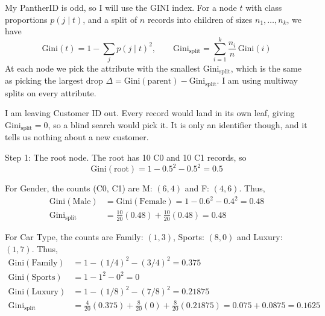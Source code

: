 \documentclass[12pt,letterpaper, onecolumn]{exam}
\begin{document}
\begin{questions}
    \begin{solution}

        My PantherID is odd, so I will use the GINI index. For a node $t$ with class proportions $p(j\mid t)$, and a split of $n$ records into children of sizes $n_1,\dots,n_k$, we have
        \begin{equation*}
            \text{Gini}(t) = 1-\sum_{j} p(j\mid t)^2, \qquad \text{Gini}_{\text{split}} = \sum_{i=1}^{k}\frac{n_i}{n}\,\text{Gini}(i)
        \end{equation*}
        At each node we pick the attribute with the smallest $\text{Gini}_{\text{split}}$, which is the same as picking the largest drop $\Delta = \text{Gini}(\text{parent})-\text{Gini}_{\text{split}}$. I am using multiway splits on every attribute.

        I am leaving Customer ID out. Every record would land in its own leaf, giving $\text{Gini}_{\text{split}}=0$, so a blind search would pick it. It is only an identifier though, and it tells us nothing about a new customer.

        Step 1: The root node. The root has 10 C0 and 10 C1 records, so
        \begin{equation*}
            \text{Gini}(\text{root}) = 1-0.5^2-0.5^2 = 0.5
        \end{equation*}

        For Gender, the counts (C0, C1) are M: $(6,4)$ and F: $(4,6)$. Thus,
        \begin{align*}
            \text{Gini}(\text{Male})&=\text{Gini}(\text{Female})=1-0.6^2-0.4^2=0.48\\
            \text{Gini}_{\text{split}} &= \tfrac{10}{20}(0.48)+\tfrac{10}{20}(0.48) = 0.48
        \end{align*}

        For Car Type, the counts are Family: $(1,3)$, Sports: $(8,0)$ and Luxury: $(1,7)$. Thus,
        \begin{align*}
            \text{Gini}(\text{Family}) &= 1-(1/4)^2-(3/4)^2 = 0.375\\
            \text{Gini}(\text{Sports}) &= 1-1^2-0^2 = 0\\
            \text{Gini}(\text{Luxury}) &= 1-(1/8)^2-(7/8)^2 = 0.21875\\
            \text{Gini}_{\text{split}} &= \tfrac{4}{20}(0.375)+\tfrac{8}{20}(0)+\tfrac{8}{20}(0.21875) = 0.075+0.0875 = 0.1625
        \end{align*}


\end{solution}
\end{questions}
\end{document}
